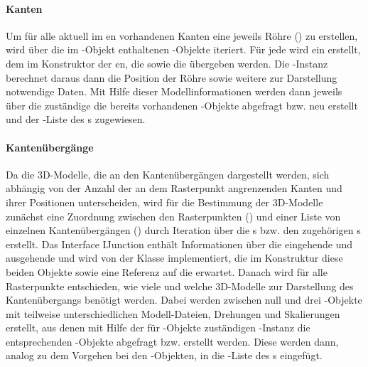 \paragraph{Kanten}

Um für alle aktuell im en vorhandenen Kanten eine jeweils Röhre () zu erstellen, wird über die im -Objekt enthaltenen -Objekte iteriert. Für jede  wird ein  erstellt, dem im Konstruktor der en, die  sowie die  übergeben werden. Die -Instanz berechnet daraus dann die Position der Röhre sowie weitere zur Darstellung notwendige Daten. Mit Hilfe dieser Modellinformationen werden dann jeweils über die zuständige  die bereits vorhandenen -Objekte abgefragt bzw. neu erstellt und der -Liste des s zugewiesen.

\paragraph{Kantenübergänge}

Da die 3D-Modelle, die an den Kantenübergängen dargestellt werden, sich abhängig von der Anzahl der an dem Rasterpunkt angrenzenden Kanten und ihrer Positionen unterscheiden, wird für die Bestimmung der 3D-Modelle zunächst eine Zuordnung zwischen den Rasterpunkten () und einer Liste von einzelnen Kantenübergängen () durch Iteration über die s bzw. den zugehörigen s erstellt. Das Interface IJunction enthält Informationen über die eingehende und ausgehende  und wird von der Klasse  implementiert, die im Konstruktur diese beiden Objekte sowie eine Referenz auf die  erwartet.
\newline\newline
Danach wird für alle Rasterpunkte entschieden, wie viele und welche 3D-Modelle zur Darstellung des Kantenübergangs benötigt werden. Dabei werden zwischen null und drei -Objekte mit teilweise unterschiedlichen Modell-Dateien, Drehungen und Skalierungen erstellt, aus denen mit Hilfe der für -Objekte zuständigen -Instanz die entsprechenden -Objekte abgefragt bzw. erstellt werden. Diese werden dann, analog zu dem Vorgehen bei den -Objekten, in die -Liste des s eingefügt.

